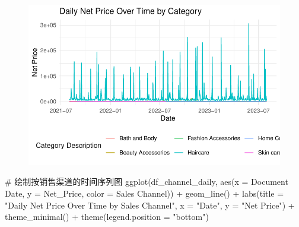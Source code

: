 \documentclass[
  letterpaper,
  DIV=11,
  numbers=noendperiod]{scrartcl}
\newenvironment{Shaded}{\begin{snugshade}}{\end{snugshade}}
\newcommand{\AttributeTok}[1]{\textcolor[rgb]{0.40,0.45,0.13}{#1}}
\newcommand{\CommentTok}[1]{\textcolor[rgb]{0.37,0.37,0.37}{#1}}
\newcommand{\FunctionTok}[1]{\textcolor[rgb]{0.28,0.35,0.67}{#1}}
\newcommand{\NormalTok}[1]{\textcolor[rgb]{0.00,0.23,0.31}{#1}}
\newcommand{\SpecialCharTok}[1]{\textcolor[rgb]{0.37,0.37,0.37}{#1}}
\newcommand{\StringTok}[1]{\textcolor[rgb]{0.13,0.47,0.30}{#1}}
\begin{document}
\begin{figure}[H]

{\centering \includegraphics{Time-Serise-EDA_files/figure-pdf/unnamed-chunk-2-2.pdf}

}

\end{figure}

\begin{Shaded}
\begin{Highlighting}[]
\CommentTok{\# 绘制按销售渠道的时间序列图}
\FunctionTok{ggplot}\NormalTok{(df\_channel\_daily, }\FunctionTok{aes}\NormalTok{(}\AttributeTok{x =} \StringTok{\textasciigrave{}}\AttributeTok{Document Date}\StringTok{\textasciigrave{}}\NormalTok{, }\AttributeTok{y =}\NormalTok{ Net\_Price, }\AttributeTok{color =} \StringTok{\textasciigrave{}}\AttributeTok{Sales Channel}\StringTok{\textasciigrave{}}\NormalTok{)) }\SpecialCharTok{+}
  \FunctionTok{geom\_line}\NormalTok{() }\SpecialCharTok{+}
  \FunctionTok{labs}\NormalTok{(}\AttributeTok{title =} \StringTok{"Daily Net Price Over Time by Sales Channel"}\NormalTok{,}
       \AttributeTok{x =} \StringTok{"Date"}\NormalTok{, }\AttributeTok{y =} \StringTok{"Net Price"}\NormalTok{) }\SpecialCharTok{+}
  \FunctionTok{theme\_minimal}\NormalTok{() }\SpecialCharTok{+}
  \FunctionTok{theme}\NormalTok{(}\AttributeTok{legend.position =} \StringTok{"bottom"}\NormalTok{)}
\end{Highlighting}
\end{Shaded}
\end{document}
